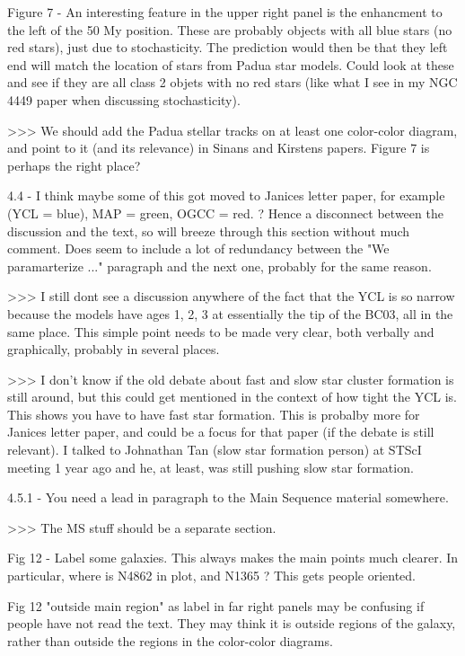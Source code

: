 Figure 7 -  An interesting  feature in the upper right panel is the enhancment to the left of the 50 My position. These are probably objects with all blue stars (no red stars), just due to stochasticity. The prediction would then be that they left end will match the location of stars from Padua star models. Could look at these and see if they are all class 2 objets with no red stars (like what I see in my NGC 4449 paper when discussing stochasticity).
 
>>> We should add the Padua stellar tracks on at least one color-color diagram, and point to it (and its relevance)  in Sinans and Kirstens papers. Figure 7 is perhaps the right place?
 
 
4.4 - I think maybe some of this got moved to Janices letter paper, for example (YCL = blue), MAP = green, OGCC = red. ? Hence a disconnect between the discussion and the text, so will breeze through this section without much comment. Does seem to include a lot of  redundancy between the "We paramarterize ..." paragraph and the next one, probably for the same reason.
 
 
>>> I still dont see a discussion anywhere of the fact that the YCL is so narrow because the models have ages 1, 2, 3 at essentially the tip of the BC03, all in the same place. This simple point needs to be made very clear, both verbally and graphically, probably in several places.
 
 
>>> I don't know if the old debate about fast and slow star cluster formation is still around, but this could get mentioned in the context of how tight the YCL is. This shows you have to have fast star formation. This is probalby more for Janices letter paper, and could be a focus for that paper (if the debate is still relevant). I talked  to Johnathan Tan (slow star formation person) at STScI meeting 1 year ago and he, at least, was still pushing slow star formation.
 
 
 
4.5.1 - You need a lead in paragraph to the Main Sequence material somewhere. 
 
>>> The MS stuff should be a separate section.
 
 
Fig 12 - Label some galaxies. This always makes the main points much clearer. In particular, where is N4862  in plot, and N1365 ? This gets people oriented. 
 
 
Fig 12 "outside main region" as label in far right panels may be confusing if people have not read the text. They may think it is outside regions of the galaxy, rather than outside the regions in the color-color diagrams.
 
